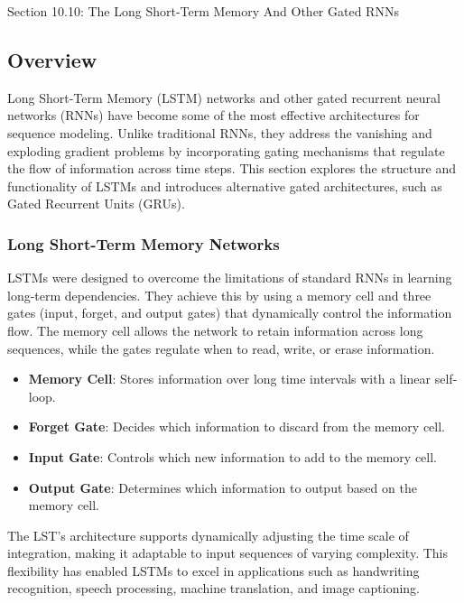 \begin{notes}{Section 10.10: The Long Short-Term Memory And Other Gated RNNs}
    \subsection*{Overview}

    Long Short-Term Memory (LSTM) networks and other gated recurrent neural networks (RNNs) have become some of the most effective architectures for sequence modeling. Unlike traditional RNNs, they address 
    the vanishing and exploding gradient problems by incorporating gating mechanisms that regulate the flow of information across time steps. This section explores the structure and functionality of LSTMs 
    and introduces alternative gated architectures, such as Gated Recurrent Units (GRUs).
    
    \subsubsection*{Long Short-Term Memory Networks}
    
    LSTMs were designed to overcome the limitations of standard RNNs in learning long-term dependencies. They achieve this by using a memory cell and three gates (input, forget, and output gates) that 
    dynamically control the information flow. The memory cell allows the network to retain information across long sequences, while the gates regulate when to read, write, or erase information.
    
    \begin{highlight}
        \begin{itemize}
            \item \textbf{Memory Cell}: Stores information over long time intervals with a linear self-loop.
            \item \textbf{Forget Gate}: Decides which information to discard from the memory cell.
            \item \textbf{Input Gate}: Controls which new information to add to the memory cell.
            \item \textbf{Output Gate}: Determines which information to output based on the memory cell.
        \end{itemize}
    \end{highlight}
    
    The LST's architecture supports dynamically adjusting the time scale of integration, making it adaptable to input sequences of varying complexity. This flexibility has enabled LSTMs to excel in 
    applications such as handwriting recognition, speech processing, machine translation, and image captioning.
    

\end{notes}
